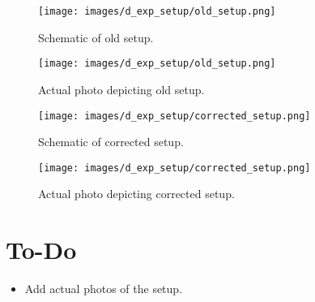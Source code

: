 \begin{figure}[h]
    \centering
    \texttt{[image: images/d\_exp\_setup/old\_setup.png]}
    \caption{Schematic of old setup.}
    \label{fig:old_setup.png}
\end{figure}

\begin{figure}[h]
    \centering
    \texttt{[image: images/d\_exp\_setup/old\_setup.png]}
    \caption{Actual photo depicting old setup.}
    \label{fig:actual_old_setup.png}
\end{figure}

\begin{figure}[h]
    \centering
    \texttt{[image: images/d\_exp\_setup/corrected\_setup.png]}
    \caption{Schematic of corrected setup.}
    \label{fig:corrected_setup.png}
\end{figure}

\begin{figure}[h]
    \centering
    \texttt{[image: images/d\_exp\_setup/corrected\_setup.png]}
    \caption{Actual photo depicting corrected setup.}
    \label{fig:actual_corrected_setup.png}
\end{figure}

\clearpage

\section{To-Do}
\begin{itemize}
    \item Add actual photos of the setup.
\end{itemize}